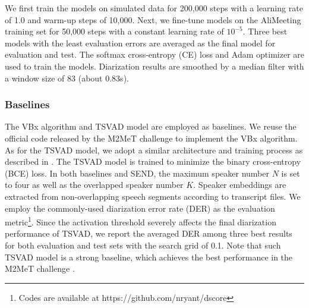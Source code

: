 \documentclass[a4paper]{article}
\begin{document}
We first train the models on simulated data for 200,000 steps with a learning rate of 1.0 and warm-up steps of 10,000.
Next, we fine-tune models on the AliMeeting training set for 50,000 steps with a constant learning rate of $10^{-5}$. Three best models with the least evaluation errors are averaged as the final model for evaluation and test.
The softmax cross-entropy (CE) loss and Adam optimizer \cite{KingmaB14} are used to train the models.
Diarization results are smoothed by a median filter with a window size of 83 (about 0.83s).

\subsubsection{Baselines}
The VBx algorithm \cite{landini2022bayesian} and TSVAD model \cite{MedennikovKPKKS20} are employed as baselines.
We reuse the official code released by the M2MeT challenge \cite{FanYu2022} to implement the VBx algorithm.
As for the TSVAD model, we adopt a similar architecture and training process as described in \cite{Weiqing2022}. 
The TSVAD model is trained to minimize the binary cross-entropy (BCE) loss.
In both baselines and SEND, the maximum speaker number $N$ is set to four as well as the overlapped speaker number $K$.
Speaker embeddings are extracted from non-overlapping speech segments according to transcript files.
We employ the commonly-used diarization error rate (DER) as the evaluation metric\footnote{Codes are available at https://github.com/nryant/dscore}.
Since the activation threshold severely affects the final diarization performance of TSVAD, we report the averaged DER among three best results for both evaluation and test sets with the search grid of 0.1. Note that such TSVAD model is a strong baseline, which achieves the best performance in the M2MeT challenge \cite{Yu2022Summary}.
\end{document}
